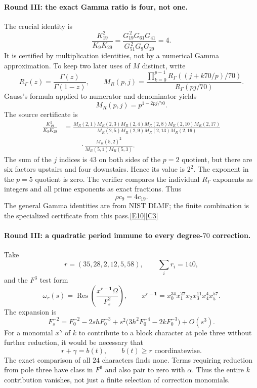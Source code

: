 \documentclass[11pt]{article}
\newcommand{\Res}{\operatorname{Res}}
\newcommand{\src}[1]{\hyperlink{src:#1}{[#1]}}
\begin{document}
\paragraph{Round III: the exact Gamma ratio is four, not one.}
The crucial identity is
\begin{equation}\label{hodge:gamma-four}
 \frac{K_{19}^2}{K_9K_{29}}
 =\frac{G_{19}^{\,2}G_{61}G_{41}}
        {G_{51}^{\,2}G_9G_{29}}
 =4.
\end{equation}
It is certified by multiplication identities, not by a numerical Gamma
approximation. To keep two later uses of $M$ distinct, write
\[
 R_\Gamma(z)=\frac{\Gamma(z)}{\Gamma(1-z)},\qquad
 M_R(p,j)=
 \frac{\prod_{k=0}^{p-1}R_\Gamma((j+k70/p)/70)}
      {R_\Gamma(pj/70)}.
\]
Gauss's formula applied to numerator and denominator yields
\[
 M_R(p,j)=p^{1-2pj/70}.
\]
The source certificate is
\begin{equation}\label{hodge:gamma-four-certificate}
 \begin{aligned}
 \frac{K_{19}^2}{K_9K_{29}}
 &=\frac{M_R(2,1)M_R(2,3)M_R(2,4)M_R(2,8)M_R(2,10)M_R(2,17)}
       {M_R(2,5)M_R(2,9)M_R(2,13)M_R(2,16)}\\
 &\hspace{1cm}\cdot\frac{M_R(5,2)^2}{M_R(5,1)M_R(5,3)}.
 \end{aligned}
\end{equation}
The sum of the $j$ indices is $43$ on both sides of the $p=2$ quotient,
but there are six factors upstairs and four downstairs. Hence its value is
$2^2$. The exponent in the $p=5$ quotient is zero. The verifier compares the
individual $R_\Gamma$ exponents as integers and all prime exponents as exact
fractions. Thus
\begin{equation}\label{hodge:rho-four}
 \rho c_9=4c_{19}.
\end{equation}
The general Gamma identities are from NIST DLMF; the finite combination is
the specialized certificate from this pass.\src{E10}\src{C3}

\paragraph{Round III: a quadratic period immune to every degree-$70$ correction.}
Take
\[
 r=(35,28,2,12,5,58),\qquad \sum_i r_i=140,
\]
and the $F^3$ test form
\[
 \omega_r(s)=\Res\left(\frac{x^{r-\mathbf1}\Omega}{F_s^2}\right),
 \qquad x^{r-\mathbf1}=x_0^{34}x_1^{27}x_2x_3^{11}x_4^4x_5^{57}.
\]
The expansion is
\begin{equation}\label{hodge:quadratic-expansion}
 F_s^{-2}=F_0^{-2}-2shF_0^{-3}
 +s^2\bigl(3h^2F_0^{-4}-2kF_0^{-3}\bigr)+O(s^3).
\end{equation}
For a monomial $x^\gamma$ of $k$ to contribute to a block character at pole
three without further reduction, it would be necessary that
\[
 r+\gamma=b(t),\qquad b(t)\ge r\text{ coordinatewise}.
\]
The exact comparison of all $24$ characters finds none. Terms requiring
reduction from pole three have class in $F^3$ and also pair to zero with
$\alpha$. Thus the entire $k$ contribution vanishes, not just a finite
selection of correction monomials.
\end{document}
